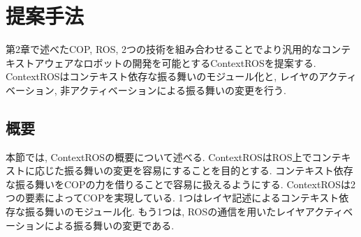 
\chapter{提案手法}
\label{cha:proposed_method}
第2章で述べたCOP, ROS, 2つの技術を組み合わせることでより汎用的なコンテキストアウェアなロボットの開発を可能とするContextROSを提案する. ContextROSはコンテキスト依存な振る舞いのモジュール化と, レイヤのアクティベーション, 非アクティベーションによる振る舞いの変更を行う.
\section{概要}
本節では, ContextROSの概要について述べる. ContextROSはROS上でコンテキストに応じた振る舞いの変更を容易にすることを目的とする. コンテキスト依存な振る舞いをCOPの力を借りることで容易に扱えるようにする. ContextROSは2つの要素によってCOPを実現している. 1つはレイヤ記述によるコンテキスト依存な振る舞いのモジュール化. もう1つは, ROSの通信を用いたレイヤアクティベーションによる振る舞いの変更である. 























